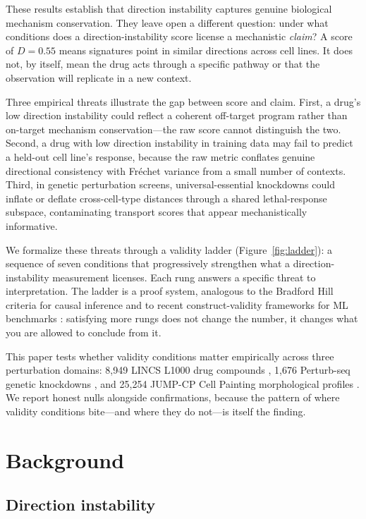 \documentclass{article}
\begin{document}
These results establish that direction instability captures genuine biological
mechanism conservation. They leave open a different question: under what
conditions does a direction-instability score license a mechanistic \emph{claim}?
A score of $D = 0.55$ means signatures point in similar directions across cell
lines. It does not, by itself, mean the drug acts through a specific pathway
or that the observation will replicate in a new context.

Three empirical threats illustrate the gap between score and claim. First,
a drug's low direction instability could reflect a coherent off-target
program rather than on-target mechanism conservation---the raw score cannot
distinguish the two. Second, a drug with low direction instability in
training data may fail to predict a held-out cell line's response, because
the raw metric conflates genuine directional consistency with Fr\'echet
variance from a small number of contexts. Third, in genetic perturbation
screens, universal-essential knockdowns could inflate or deflate
cross-cell-type distances through a shared lethal-response subspace,
contaminating transport scores that appear mechanistically informative.

We formalize these threats through a validity ladder (Figure~\ref{fig:ladder}):
a sequence of seven conditions that progressively strengthen what a
direction-instability measurement licenses. Each rung answers a specific
threat to interpretation. The ladder is a proof system, analogous to the
Bradford Hill criteria for causal inference and to recent
construct-validity frameworks for ML benchmarks
\citep{freiesleben2025benchmarking}: satisfying more rungs does not change
the number, it changes what you are allowed to conclude from it.

This paper tests whether validity conditions matter empirically across three
perturbation domains: 8{,}949 LINCS L1000 drug compounds
\citep{subramanian2017next}, 1{,}676 Perturb-seq genetic knockdowns
\citep{replogle2022mapping}, and 25{,}254 JUMP-CP Cell Painting morphological
profiles \citep{chandrasekaran2023jump}. We report honest nulls
alongside confirmations, because the pattern of where validity conditions
bite---and where they do not---is itself the finding.

\section{Background}

\subsection{Direction instability}
\end{document}
